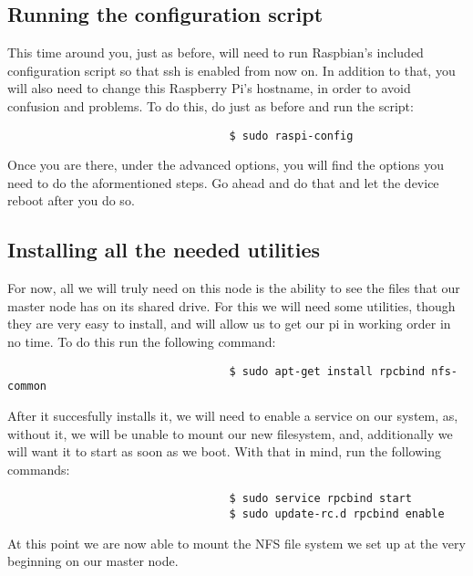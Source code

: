 \documentclass[]{article}
\begin{document}
                                  \subsection{Running the configuration script}
                                  This time around you, just as before, will need to run Raspbian's included configuration script so that ssh is enabled from now on.
                                  In addition to that, you will also need to change this Raspberry Pi's hostname, in order to avoid confusion and problems. To do this,
                                  do just as before and run the script:
                                  \begin{lstlisting}
                                  $ sudo raspi-config
                                  \end{lstlisting}
                                  Once you are there, under the advanced options, you will find the options you need to do the aformentioned steps. Go ahead and do that 
                                  and let the device reboot after you do so.

                                  \subsection{Installing all the needed utilities}
                                  For now, all we will truly need on this node is the ability to see the files that our master node has on its shared drive. For this we
                                  will need some utilities, though they are very easy to install, and will allow us to get our pi in working order in no time. To do this
                                  run the following command:
                                  \begin{lstlisting}
                                  $ sudo apt-get install rpcbind nfs-common
                                  \end{lstlisting}
                                  After it succesfully installs it, we will need to enable a service on our system, as, without it, we will be unable to mount our new
                                  filesystem, and, additionally we will want it to start as soon as we boot. With that in mind, run the following commands:
                                  \begin{lstlisting}
                                  $ sudo service rpcbind start
                                  $ sudo update-rc.d rpcbind enable
                                  \end{lstlisting}
                                  At this point we are now able to mount the NFS file system we set up at the very beginning on our master node.
\end{document}
